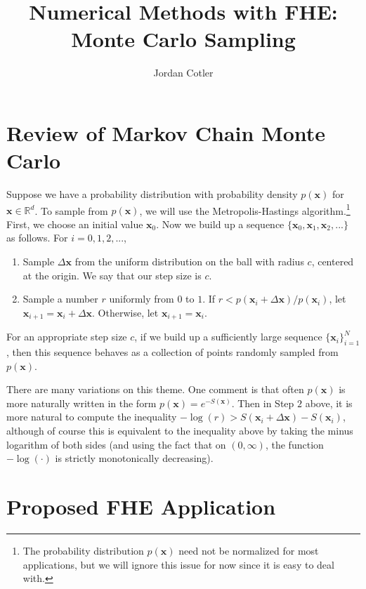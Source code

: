 \documentclass[12pt]{article}
\title{Numerical Methods with FHE: \\ Monte Carlo Sampling}
\author{Jordan Cotler}
\date{}                                           %
\begin{document}
\maketitle

\section{Review of Markov Chain Monte Carlo}

Suppose we have a probability distribution with probability density $p(\textbf{x})$ for $\textbf{x} \in \mathbb{R}^d$.  To sample from $p(\textbf{x})$, we will use the Metropolis-Hastings algorithm.\footnote{The probability distribution $p(\textbf{x})$ need not be normalized for most applications, but we will ignore this issue for now since it is easy to deal with.}  First, we choose an initial value $\textbf{x}_0$.  Now we build up a sequence $\{\textbf{x}_0, \textbf{x}_1, \textbf{x}_2,...\}$ as follows.  For $i=0,1,2,...$,
\begin{enumerate}
\item Sample $\Delta \textbf{x}$ from the uniform distribution on the ball with radius $c$, centered at the origin.  We say that our step size is $c$. 
\item Sample a number $r$ uniformly from $0$ to $1$.  If $r < p(\textbf{x}_i + \Delta \textbf{x})/p(\textbf{x}_i)$, let $\textbf{x}_{i+1} = \textbf{x}_i + \Delta \textbf{x}$.  Otherwise, let $\textbf{x}_{i+1} = \textbf{x}_i$.
\end{enumerate}
For an appropriate step size $c$, if we build up a sufficiently large sequence $\{\textbf{x}_i\}_{i=1}^N$, then this sequence behaves as a collection of points randomly sampled from $p(\textbf{x})$.

There are many variations on this theme.  One comment is that often $p(\textbf{x})$ is more naturally written in the form $p(\textbf{x}) = e^{- S(\textbf{x})}$.  Then in Step $2$ above, it is more natural to compute the inequality $- \log(r) > S(\textbf{x}_i + \Delta \textbf{x}) - S(\textbf{x}_i)$, although of course this is equivalent to the inequality above by taking the minus logarithm of both sides (and using the fact that on $(0,\infty)$, the function $- \log(\cdot)$ is strictly monotonically decreasing).


\section{Proposed FHE Application}
\end{document}
